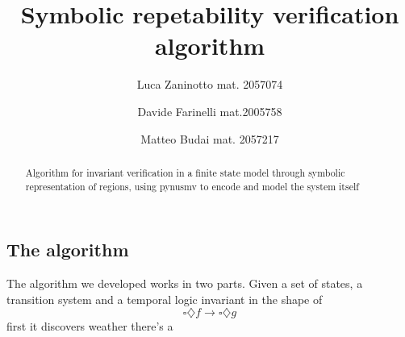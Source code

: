 \documentclass[9pt,oneside]{amsart}
\title{Symbolic repetability verification algorithm}
\author{
  Luca Zaninotto mat. 2057074 
  \and
  Davide Farinelli mat.2005758
  \and
  Matteo Budai mat. 2057217
}
\begin{document}
\begin{abstract}
  Algorithm for invariant verification in a finite state model through
  symbolic representation of regions, using pynusmv to encode and
  model the system itself
\end{abstract}
\maketitle
\setlength{\columnsep}{20pt}
\begin{multicols}{2}
  \section{The algorithm}\label{algo}
  The algorithm we developed works in two parts. Given a set of
  states, a transition system and a temporal logic invariant in the
  shape of
  \[
    \square \diamondsuit f \rightarrow \square \diamondsuit g
  \]
  first it discovers weather there's a
\end{multicols}
\end{document}

